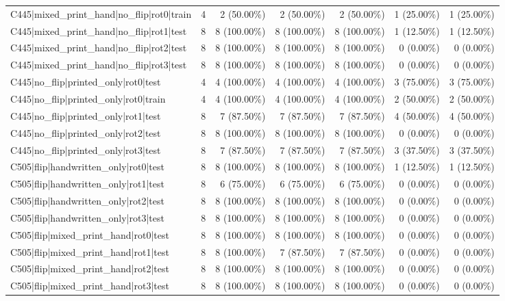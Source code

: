 \begin{longtable}{>{\raggedright\arraybackslash}p{5cm}rrrrrr}
C445|mixed\_print\_hand|no\_flip|rot0|train & 4 & 2 (50.00\%) & 2 (50.00\%) & 2 (50.00\%) & 1 (25.00\%) & 1 (25.00\%) \\
C445|mixed\_print\_hand|no\_flip|rot1|test & 8 & 8 (100.00\%) & 8 (100.00\%) & 8 (100.00\%) & 1 (12.50\%) & 1 (12.50\%) \\
C445|mixed\_print\_hand|no\_flip|rot2|test & 8 & 8 (100.00\%) & 8 (100.00\%) & 8 (100.00\%) & 0 (0.00\%) & 0 (0.00\%) \\
C445|mixed\_print\_hand|no\_flip|rot3|test & 8 & 8 (100.00\%) & 8 (100.00\%) & 8 (100.00\%) & 0 (0.00\%) & 0 (0.00\%) \\
C445|no\_flip|printed\_only|rot0|test & 4 & 4 (100.00\%) & 4 (100.00\%) & 4 (100.00\%) & 3 (75.00\%) & 3 (75.00\%) \\
C445|no\_flip|printed\_only|rot0|train & 4 & 4 (100.00\%) & 4 (100.00\%) & 4 (100.00\%) & 2 (50.00\%) & 2 (50.00\%) \\
C445|no\_flip|printed\_only|rot1|test & 8 & 7 (87.50\%) & 7 (87.50\%) & 7 (87.50\%) & 4 (50.00\%) & 4 (50.00\%) \\
C445|no\_flip|printed\_only|rot2|test & 8 & 8 (100.00\%) & 8 (100.00\%) & 8 (100.00\%) & 0 (0.00\%) & 0 (0.00\%) \\
C445|no\_flip|printed\_only|rot3|test & 8 & 7 (87.50\%) & 7 (87.50\%) & 7 (87.50\%) & 3 (37.50\%) & 3 (37.50\%) \\
C505|flip|handwritten\_only|rot0|test & 8 & 8 (100.00\%) & 8 (100.00\%) & 8 (100.00\%) & 1 (12.50\%) & 1 (12.50\%) \\
C505|flip|handwritten\_only|rot1|test & 8 & 6 (75.00\%) & 6 (75.00\%) & 6 (75.00\%) & 0 (0.00\%) & 0 (0.00\%) \\
C505|flip|handwritten\_only|rot2|test & 8 & 8 (100.00\%) & 8 (100.00\%) & 8 (100.00\%) & 0 (0.00\%) & 0 (0.00\%) \\
C505|flip|handwritten\_only|rot3|test & 8 & 8 (100.00\%) & 8 (100.00\%) & 8 (100.00\%) & 0 (0.00\%) & 0 (0.00\%) \\
C505|flip|mixed\_print\_hand|rot0|test & 8 & 8 (100.00\%) & 8 (100.00\%) & 8 (100.00\%) & 0 (0.00\%) & 0 (0.00\%) \\
C505|flip|mixed\_print\_hand|rot1|test & 8 & 8 (100.00\%) & 7 (87.50\%) & 7 (87.50\%) & 0 (0.00\%) & 0 (0.00\%) \\
C505|flip|mixed\_print\_hand|rot2|test & 8 & 8 (100.00\%) & 8 (100.00\%) & 8 (100.00\%) & 0 (0.00\%) & 0 (0.00\%) \\
C505|flip|mixed\_print\_hand|rot3|test & 8 & 8 (100.00\%) & 8 (100.00\%) & 8 (100.00\%) & 0 (0.00\%) & 0 (0.00\%) \\

\end{longtable}
